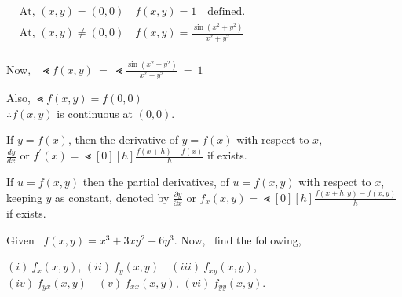 \documentclass[12pt]{article}
\begin{document}
\vspace{-\baselineskip}

\vspace{1ex}
$\begin{aligned}
   &\text{At,\ } (x,y) = (0,0) \quad f(x,y)=1 \quad \text{defined.}\\
   &\text{At,\ } (x,y) \neq (0,0) \quad f(x,y)=\frac{\sin{(x^2+y^2)}}{x^2+y^2}\\
\end{aligned}$

\vspace{2ex}
Now, \ $\Lt f(x, y) \ = \ \Lt \frac{\sin{(x^2+y^2)}}{x^2+y^2} \ = \ 1$

\vspace{3ex}
Also, $\Lt f(x, y) = f(0,0)$\\[1ex]
$\therefore f(x,y)$ is continuous at $(0,0)$.

\vspace{3ex}
If $y=f(x)$, then the derivative of $y=f(x)$
with respect to $x$,\\[1ex]
$\frac{dy}{dx} \text{ or } f^\prime(x) = \Lt[0][h] \frac{f(x+h)-f(x)}{h}$ if exists.

\vspace{4ex}
If $u=f(x,y)$ then the partial derivatives, of $u=f(x,y)$ with respect to $x$, keeping $y$ as constant, denoted by $\frac{\partial{y}}{\partial{x}} \text{ or } f_{x}(x,y) = \Lt[0][h] \frac{f(x+h,y)-f(x,y)}{h}$ if exists.

\vspace{5ex}
\textbf{} Given \ $f(x,y) = x^3+3xy^2+6y^3$. Now, \ find the following,

\tabs \tabs $(i) \ f_x(x,y)$, \quad $(ii) \ f_y(x,y) \quad (iii) \ f_{xy}(x,y)$, \quad $(iv) \ f_{yx}(x,y) \quad (v) \ f_{xx}(x,y)$, \quad $(vi) \ f_{yy}(x,y)$.


\end{document}
